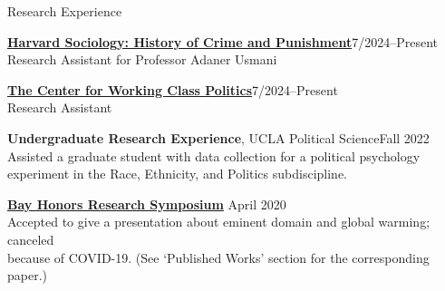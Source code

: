 \documentclass[
	12pt, %
]{resume} %
\begin{document}
\begin{samepage}
\begin{rSection}{Research Experience}
%

\href{https://sociology.fas.harvard.edu/}{\textbf{Harvard Sociology: History of Crime and Punishment}}\hfill 7/2024--Present\\
\hspace*{20pt}Research Assistant for Professor Adaner Usmani

\href{https://www.workingclasspolitics.org/}{\textbf{The Center for Working Class Politics}}\hfill 7/2024--Present\\
\hspace*{20pt}Research Assistant


\textbf{Undergraduate Research Experience}, UCLA Political Science\hfill Fall 2022\\
\hspace*{20pt}Assisted a graduate student with data collection for a political psychology\\ 
\hspace*{20pt}experiment in the Race, Ethnicity, and Politics subdiscipline.

\href{https://bayhonors.org/}{\textbf{Bay Honors Research Symposium}} \hfill  April 2020\\
\hspace*{20pt}Accepted to give a presentation about eminent domain and global warming; canceled\\
\hspace*{20pt}because of COVID-19. (See ‘Published Works’ section for the corresponding paper.)

\end{rSection}
\end{samepage}
\end{document}
